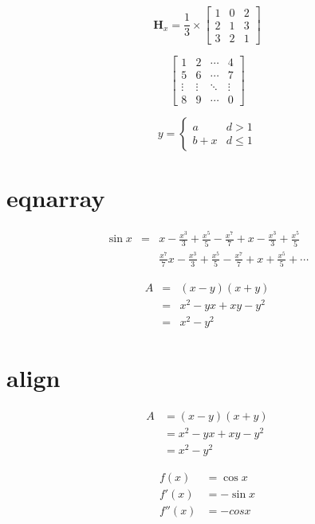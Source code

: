 \documentclass[12pt]{article}
\begin{document}
\begin{displaymath}
\mathbf{H}_x=\frac{1}{3} \times \left[\begin{array}{ccc}
1&0&2\\
2&1&3\\
3&2&1
\end{array}\right]
\end{displaymath}

\begin{displaymath}
\left[\begin{array}{cccc}
1&2&\cdots &4\\
5&6&\cdots &7\\
\vdots &\vdots &\ddots &\vdots \\
8&9&\cdots &0
\end{array}\right]
\end{displaymath}

\begin{displaymath}
y=\left\{\begin{array}{ll}
a&d>1\\
b+x&d\leq 1
\end{array}\right.
\end{displaymath}

\section{eqnarray}
\begin{eqnarray}
\sin x &=& x-\frac{x^3}{3} +\frac{x^5}{5}- \frac{x^7}{7} +x-\frac{x^3}{3} +\frac{x^5}{5} \\ \nonumber
           & &\frac{x^7}{7} x-\frac{x^3}{3} +\frac{x^5}{5}- \frac{x^7}{7} +x+\frac{x^5}{5} +\cdots
\end{eqnarray}

\setlength\arraycolsep{2pt}
\begin{eqnarray}
A&=&(x-y)(x+y)\\ \nonumber
  &=&x^2-yx+xy-y^2\\ \nonumber
  &=&x^2-y^2 
\end{eqnarray}

\section{align}
\begin{align*}
A&=(x-y)(x+y)\\ \nonumber
  &=x^2-yx+xy-y^2\\ \nonumber
  &=x^2-y^2 
\end{align*}

\begin{align*}
f(x)&=\cos x \\
f'(x)&=-\sin x \\
f''(x)&=-cos x
\end{align*}
\end{document}

